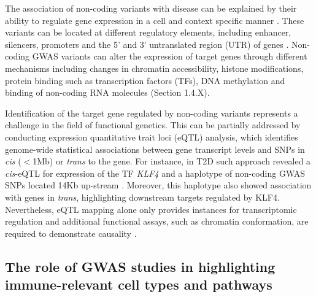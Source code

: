 The association of non-coding variants with disease can be explained by their ability to regulate gene expression in a cell and context specific manner \parencite{Fairfax2012}. These variants can be located at different regulatory elements, including enhancer, silencers, promoters and the 5' and 3' untranslated region (UTR) of genes \parencite{Ward2012}. Non-coding GWAS variants can alter the expression of target genes through different mechanisms including changes in chromatin accessibility, histone modifications, protein binding such as transcription factors (TFs), DNA methylation and binding of non-coding  RNA molecules\parencite{Knight2014} (Section 1.4.X).

Identification of the target gene regulated by non-coding variants represents a challenge in the field of functional genetics. This can be partially addressed by conducting expression quantitative trait loci (eQTL) analysis, which identifies genome-wide statistical associations between gene transcript levels and SNPs in \textit{cis} ($<$1Mb) or \textit{trans} to the gene. For instance, in T2D such approach revealed a \textit{cis}-eQTL for expression of the TF \textit{KLF4} and a haplotype of non-coding GWAS SNPs located 14Kb up-stream \parencite{Small2011}. Moreover, this haplotype also showed association with genes in \textit{trans}, highlighting downstream targets regulated by KLF4. Nevertheless, eQTL mapping alone only provides instances for transcriptomic regulation and additional functional assays, such as chromatin conformation, are required to demonstrate causality \parencite{Edwards2013}.  


\subsection{The role of GWAS studies in highlighting immune-relevant cell types and pathways}

